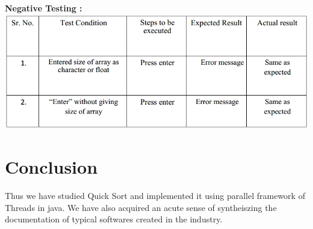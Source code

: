 \documentclass[10pt,a4paper]{article}
\begin{document}
\textbf{Negative Testing :}\\
\includegraphics[width=\textwidth]{quicksort_negative}

\section{Conclusion}
Thus we have studied Quick Sort and implemented it using parallel framework of Threads in java. We have also acquired an acute sense of syntheiszing the documentation of typical softwares created in the industry.
\end{document}
